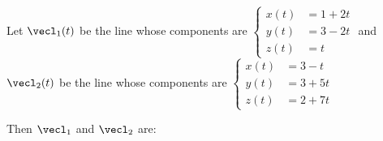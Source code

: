 \documentclass{ximera}
\author{Gregory Hartman \and Matthew Carr}
\begin{document}
\begin{exercise}
Let $\vecl_{1}(t)$ be the line whose components are $\left\{ \begin{aligned}x(t) & =1+2t\\
y(t) & =3-2t\\
z(t) & =t
\end{aligned}
\right.$  and $\vecl_{2}(t)$ be the line whose components are $\left\{ \begin{aligned}x(t) & =3-t\\
y(t) & =3+5t\\
z(t) & =2+7t
\end{aligned}
\right.$

Then $\vecl_{1}$ and $\vecl_{2}$ are: 

\begin{multipleChoice}
\end{multipleChoice}


\end{exercise}
\end{document}
